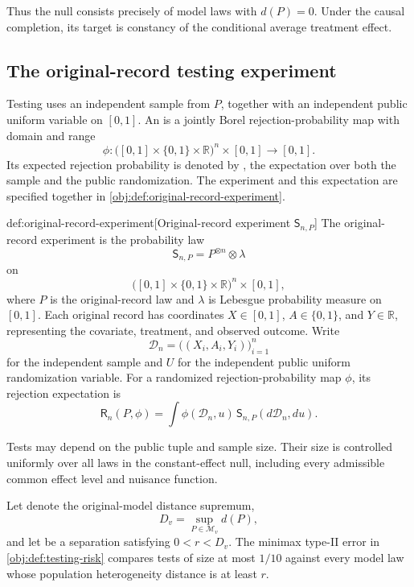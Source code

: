 \documentclass[11pt]{article}
\begin{document}
Thus the null consists precisely of model laws with \(d(P)=0\). Under the causal completion, its target is constancy of the conditional average treatment effect.

\subsection{The original-record testing experiment}

Testing uses an independent sample  from \(P\), together with an independent public uniform variable  on \([0,1]\). An  is a jointly Borel rejection-probability map  with domain and range
\[
\phi:
\bigl([0,1]\times\{0,1\}\times\mathbb R\bigr)^n\times[0,1]
\longrightarrow[0,1].
\]
Its expected rejection probability is denoted by , the expectation over both the sample and the public randomization. The experiment and this expectation are specified together in \cref{obj:def:original-record-experiment}.

\begin{definitionv}{def:original-record-experiment}[Original-record experiment \(\mathsf S_{n,P}\)]
The original-record experiment is the probability law
\[
\mathsf S_{n,P}=P^{\otimes n}\otimes\lambda
\]
on
\[
\bigl([0,1]\times\{0,1\}\times\mathbb R\bigr)^n\times[0,1],
\]
where \(P\) is the original-record law and \(\lambda\) is Lebesgue probability measure on \([0,1]\). Each original record has coordinates \(X\in[0,1]\), \(A\in\{0,1\}\), and \(Y\in\mathbb R\), representing the covariate, treatment, and observed outcome. Write
\[
\mathcal D_n=\bigl((X_i,A_i,Y_i)\bigr)_{i=1}^n
\]
for the independent sample and \(U\) for the independent public uniform randomization variable. For a randomized rejection-probability map \(\phi\), its rejection expectation is
\[
\mathsf R_n(P,\phi)
=
\int\phi(\mathcal D_n,u)\,
\mathsf S_{n,P}(d\mathcal D_n,du).
\]
\end{definitionv}

Tests may depend on the public tuple and sample size. Their size is controlled uniformly over all laws in the constant-effect null, including every admissible common effect level and nuisance function.

Let  denote the original-model distance supremum,
\[
D_v=\sup_{P\in\mathcal M_v}d(P),
\]
and let  be a separation satisfying \(0<r<D_v\). The minimax type-II error  in \cref{obj:def:testing-risk} compares tests of size at most \(1/10\) against every model law whose population heterogeneity distance is at least \(r\).
\end{document}
